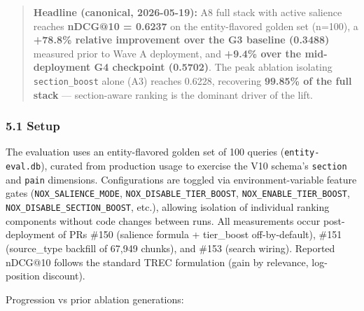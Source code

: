 \documentclass[
]{article}
\begin{document}
\begin{quote}
\textbf{Headline (canonical, 2026-05-19):} A8 full stack with active
salience reaches \textbf{nDCG@10 = 0.6237} on the entity-flavored golden
set (n=100), a \textbf{+78.8\% relative improvement over the G3 baseline
(0.3488)} measured prior to Wave A deployment, and \textbf{+9.4\% over
the mid-deployment G4 checkpoint (0.5702)}. The peak ablation isolating
\texttt{section\_boost} alone (A3) reaches 0.6228, recovering
\textbf{99.85\% of the full stack} --- section-aware ranking is the
dominant driver of the lift.
\end{quote}

\subsubsection{5.1 Setup}\label{setup}

The evaluation uses an entity-flavored golden set of 100 queries
(\texttt{entity-eval.db}), curated from production usage to exercise the
V10 schema's \texttt{section} and \texttt{pain} dimensions.
Configurations are toggled via environment-variable feature gates
(\texttt{NOX\_SALIENCE\_MODE}, \texttt{NOX\_DISABLE\_TIER\_BOOST},
\texttt{NOX\_ENABLE\_TIER\_BOOST},
\texttt{NOX\_DISABLE\_SECTION\_BOOST}, etc.), allowing isolation of
individual ranking components without code changes between runs. All
measurements occur post-deployment of PRs \#150 (salience formula +
tier\_boost off-by-default), \#151 (source\_type backfill of 67,949
chunks), and \#153 (search wiring). Reported nDCG@10 follows the
standard TREC formulation (gain by relevance, log-position discount).

Progression vs prior ablation generations:
\end{document}
